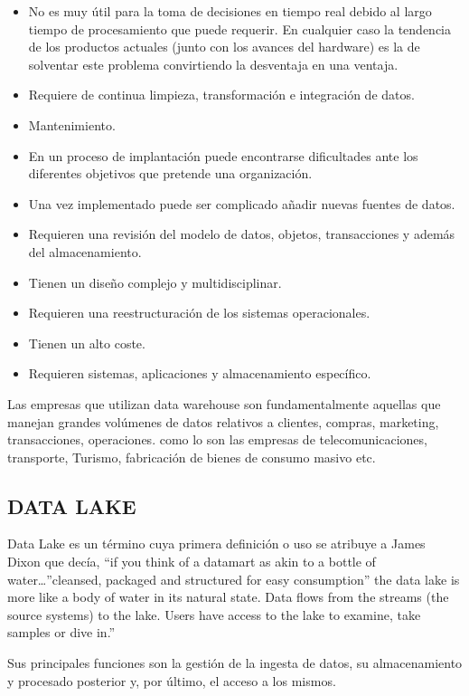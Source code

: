 \documentclass[preprint,12pt]{elsarticle}
\begin{document}
\begin{itemize}

\item No es muy útil para la toma de decisiones en tiempo real debido al largo tiempo de procesamiento que puede requerir. En cualquier caso la tendencia de los productos actuales (junto con los avances del hardware) es la de solventar este problema convirtiendo la desventaja en una ventaja.
\item Requiere de continua limpieza, transformación e integración de datos.
\item Mantenimiento.
\item En un proceso de implantación puede encontrarse dificultades ante los diferentes objetivos que pretende una organización.
\item Una vez implementado puede ser complicado añadir nuevas fuentes de datos.
\item Requieren una revisión del modelo de datos, objetos, transacciones y además del almacenamiento.
\item Tienen un diseño complejo y multidisciplinar.
\item Requieren una reestructuración de los sistemas operacionales.
\item Tienen un alto coste.
\item Requieren sistemas, aplicaciones y almacenamiento específico.
\end{itemize}
Las empresas que utilizan data warehouse son fundamentalmente aquellas que manejan grandes volúmenes de datos relativos a clientes, compras, marketing, transacciones, operaciones. como lo son las empresas de telecomunicaciones, transporte, Turismo, fabricación de bienes de consumo masivo etc.

\subsection{DATA LAKE}

Data Lake es un término cuya primera definición o uso se atribuye a James Dixon que decía, “if you think of a datamart as akin to a bottle of water…”cleansed, packaged and structured for easy consumption” the data lake is more like a body of water in its natural state. Data flows from the streams (the source systems) to the lake. Users have access to the lake to examine, take samples or dive in.”

Sus principales funciones son  la gestión de la ingesta de datos, su almacenamiento y procesado posterior y, por último, el acceso a los mismos.
\end{document}
